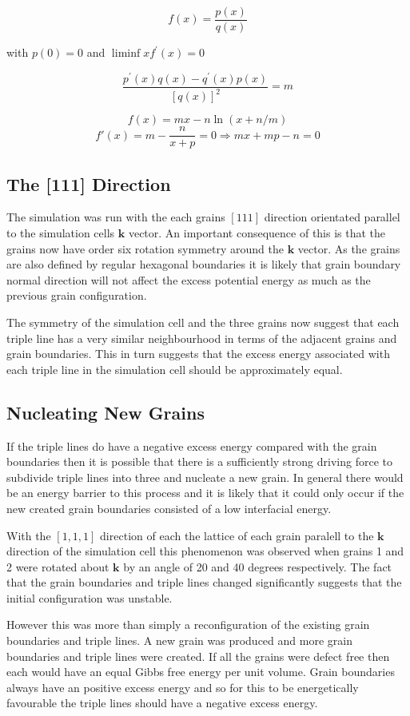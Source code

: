 \documentclass[12pt,a4paper]{book}
\begin{document}
\[ f(x) = \frac{p(x)}{q(x)} \]

with $p(0)=0$ and $\liminf{x}{f^{\prime}(x)}=0$

\[ \frac{p^{\prime}(x)q(x) -q^{\prime}(x)p(x)}{[q(x)]^2} = m\]


\[ f(x) = mx - n\ln(x+n/m)\]
\[ f'(x) = m -\frac{n}{x+p} = 0 \Rightarrow  mx + mp - n = 0 \]


\subsection{The [111] Direction}
The simulation was run with the each grains $[111]$ direction orientated parallel to the simulation cells $\mathbf{k}$ vector. An important consequence of this is that the grains now have order six rotation symmetry around the $\mathbf{k}$ vector. As the grains are also defined by regular hexagonal boundaries it is likely that grain boundary normal direction will not affect the excess potential energy as much as the previous grain configuration.

The symmetry of the simulation cell and the three grains now suggest that each triple line has a very similar neighbourhood in terms of the adjacent grains and grain boundaries. This in turn suggests that the excess energy associated with each triple line in the simulation cell should be approximately equal.

\subsection{Nucleating New Grains}

If the triple lines do have a negative excess energy compared with the grain boundaries then it is possible that there is a sufficiently strong driving force to subdivide triple lines into three and nucleate a new grain. In general there would be an energy barrier to this process and it is likely that it could only occur if the new created grain boundaries consisted of a low interfacial energy.

With the $[1,1,1]$ direction of each the lattice of each grain paralell to the $\mathbf{k}$ direction of the simulation cell this phenomenon was observed when grains 1 and 2 were rotated about $\mathbf{k}$  by an angle of 20 and 40 degrees respectively. The fact that the grain boundaries and triple lines changed significantly suggests that the initial configuration was unstable. 

However this was more than simply a reconfiguration of the existing grain boundaries and triple lines. A new grain was produced and more grain boundaries and triple lines were created. If all the grains were defect free then each would have an equal Gibbs free energy per unit volume. Grain boundaries always have an positive excess energy and so for this to be energetically favourable the triple lines should have a negative excess energy.
\end{document}
